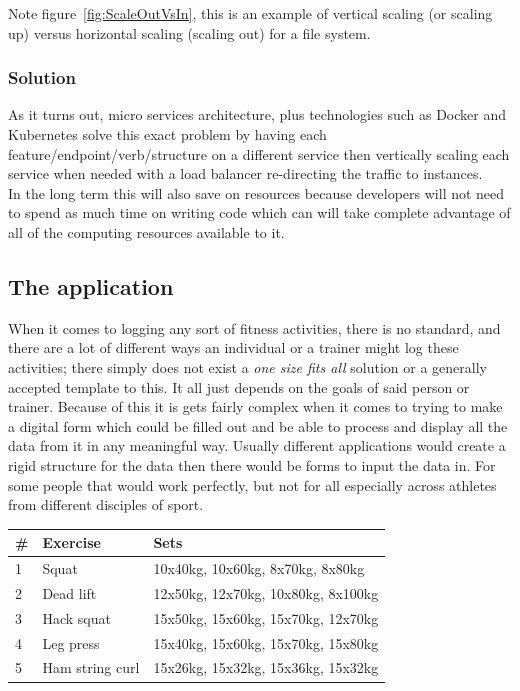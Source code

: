 \documentclass{article}
\newcommand{\vspaceconst}{-2ex}
\begin{document}
\begin{multicols}{2}
Note figure~\ref{fig:ScaleOutVsIn}, this is an example of vertical scaling (or scaling up) versus horizontal scaling (scaling out) for a file system. \\

\subsubsection{Solution}
\vspace{\vspaceconst}
As it turns out, micro services architecture, plus technologies such as Docker and Kubernetes solve this exact problem by having each feature/endpoint/verb/structure on a different service then vertically scaling each service when needed with a load balancer re-directing the traffic to instances.\\
In the long term this will also save on resources because developers will not need to spend as much time on writing code which can will take complete advantage of all of the computing resources available to it.\\

\subsection{The application}
\vspace{\vspaceconst}

When it comes to logging any sort of fitness activities, there is no standard, and there are a lot of different ways an individual or a trainer might log these activities; there simply does not exist a \textit{one size fits all} solution or a generally accepted template to this. It all just depends on the goals of said person or trainer. Because of this it is gets fairly complex when it comes to trying to make a digital form which could be filled out and be able to process and display all the data from it in any meaningful way. Usually different applications would create a rigid structure for the data then there would be forms to input the data in. For some people that would work perfectly, but not for all especially across athletes from different disciples of sport.\\

\begingroup
\centering
\begin{tabular}{l l p{3cm}}
  \toprule
  \# & Exercise & Sets \\ [0.5ex]
  \midrule
  1 & Squat & 10x40kg, 10x60kg, 8x70kg, 8x80kg\\
  \midrule
  2 & Dead lift & 12x50kg, 12x70kg, 10x80kg, 8x100kg\\
  \midrule
  3 & Hack squat & 15x50kg, 15x60kg, 15x70kg, 12x70kg\\
  \midrule
  4 & Leg press & 15x40kg, 15x60kg, 15x70kg, 15x80kg\\
  \midrule
  5 & Ham string curl & 15x26kg, 15x32kg, 15x36kg, 15x32kg\\
  \bottomrule
\end{tabular}
~\label{table:WorkoutLogExample1}
\endgroup


\end{multicols}
\end{document}

